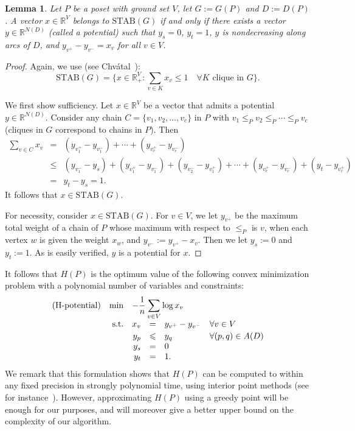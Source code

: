 \documentclass[12pt,oneside]{article}
\newtheorem{lemma}{Lemma}
\newcommand{\STAB}{\mathrm{STAB}}
\begin{document}
\begin{lemma}
\label{lem-potential}
Let $P$ be a poset with ground set $V$, let $G:=G(P)$ and $D:=D(P)$. A vector $x \in \mathbb{R}^V$ belongs to $\STAB(G)$ if and only if there exists a vector $y \in \mathbb{R}^{{N(D)}}$ (called a \emph{potential\/}) such that $y_{s} = 0$, $y_{t} = 1$, $y$ is nondecreasing along arcs of $D$, and $y_{v^+} - y_{v^-} = x_v$ for all $v \in V$.
\end{lemma}
\begin{proof}
Again, we use (see Chv\'atal~\cite{C75}):
$$
\STAB(G) = \{x \in \mathbb{R}^V_+ : \sum_{v \in K} x_v \le 1\quad \forall K \textrm{ clique in } G\}.
$$

We first show sufficiency. Let $x \in \mathbb{R}^V$ be a vector that admits a potential $y \in \mathbb{R}^{N(D)}$. Consider any chain $C = \{v_1,v_2,\ldots,v_c\}$ in $P$ with $v_1 \leqslant_P v_2 \leqslant_P\cdots \leqslant_P v_c$ (cliques in $G$ correspond to chains in $P$). Then
\begin{eqnarray*}
\sum_{v \in C} x_v &= & (y_{v_1^+}-y_{v_1^-}) + \cdots + (y_{v_c^+}-y_{v_c^-})\\
&\le &(y_{v_1^-}-y_{s}) + (y_{v_1^+}-y_{v_1^-}) +
(y_{v_2^-} - y_{v_1^+}) + \cdots + (y_{v_c^+}-y_{v_c^-}) + (y_{t} - y_{v_c^+})\\[2ex]
&= &y_{t} - y_{s} = 1.
\end{eqnarray*}
It follows that $x \in \STAB(G)$.

For necessity, consider $x \in \STAB(G)$. For $v \in V$, we let $y_{v^+}$ be the maximum total weight of a chain of $P$ whose maximum with respect to $\leqslant_{P}$ is $v$,
when each vertex $w$ is given the weight $x_w$, and $y_{v^-} := y_{v^+} - x_v$. Then we let $y_{s} := 0$ and $y_{t} := 1$. As is easily verified, $y$ is a potential for $x$.
\end{proof}

It follows that $H(P)$ is the optimum value of the following convex minimization problem with a polynomial number of variables and constraints:
$$
\begin{array}{rrrcll}
\textrm{\rm (H-potential)}
&\min &\multicolumn{3}{l}{\displaystyle -\frac{1}{n} \sum_{v \in V} \log x_v}\\
&\textrm{\rm s.t.} &x_v  &= &y_{v^+} - y_{v^-} &\forall v \in V\\[.5ex]
&                  &y_{p}   &\leqslant &y_{q} &\forall (p,q) \in A(D)\\
&                  &y_{s} &= &0\\
&                  &y_{t}  &= &1.
\end{array}
$$
We remark that this formulation shows that $H(P)$ can be computed to within any fixed precision in strongly polynomial time, using interior point methods (see for instance~\cite{NN94}). However, approximating  $H(P)$ using a greedy point will be enough for our purposes, and will moreover give a better upper bound on the complexity of our algorithm.
\end{document}
